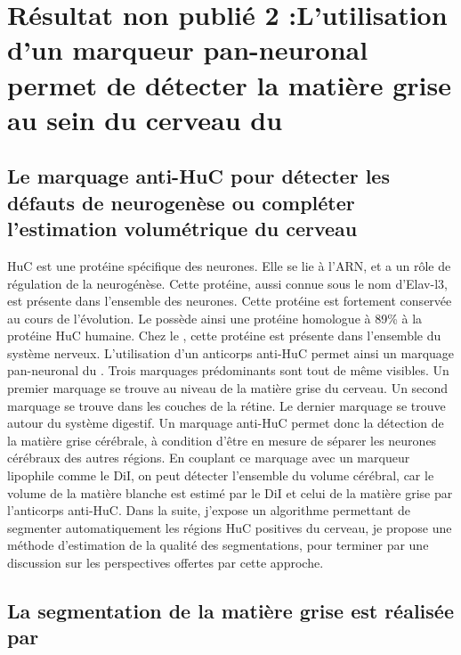 \documentclass[\main/main.tex]{subfiles}
\begin{document}
                    
\chapter{Résultat non publié 2 :L'utilisation d'un marqueur pan-neuronal permet de détecter la matière grise au sein du cerveau du \pz{}
}
\label{sec:HuC}


    \section{Le marquage anti-HuC pour détecter les défauts de neurogenèse ou compléter l'estimation volumétrique du cerveau}

%
HuC est une protéine spécifique des neurones. Elle se lie à l'ARN, et a un rôle de régulation de la neurogénèse. Cette protéine, aussi connue sous le nom d'Elav-l3, est présente dans l'ensemble des neurones. Cette protéine est fortement conservée au cours de l'évolution. Le \pz{} possède ainsi une protéine homologue à 89\% à la protéine HuC humaine.
%
Chez le \pz{}, cette protéine est présente dans l'ensemble du système nerveux.
L'utilisation d'un anticorps anti-HuC permet ainsi un marquage pan-neuronal du \pz{}. Trois marquages prédominants sont tout de même visibles. Un premier marquage se trouve au niveau de la matière grise du cerveau. Un second marquage se trouve dans les couches de la rétine. Le dernier marquage se trouve autour du système digestif.
Un marquage anti-HuC permet donc la détection de la matière grise cérébrale, à condition d'être en mesure de séparer les neurones cérébraux des autres régions. En couplant ce marquage avec un marqueur lipophile comme le DiI, on peut détecter l'ensemble du volume cérébral, car le volume de la matière blanche est estimé par le DiI et celui de la matière grise par l'anticorps anti-HuC.
Dans la suite, j'expose un algorithme permettant de segmenter automatiquement les régions HuC positives du cerveau, je propose une méthode d'estimation de la qualité des segmentations, pour terminer par une discussion sur les perspectives offertes par cette approche.
    
    \section{La segmentation de la matière grise est réalisée par \watershed{}}
    
\end{document}
